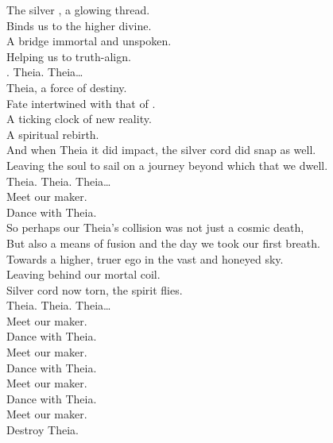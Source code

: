 
\label{album:the-silver-cord}



The silver , a glowing thread. \\
Binds us to the higher divine. \\
A bridge immortal and unspoken. \\
Helping us to truth-align. \\

. Theia. Theia… \\

Theia, a force of destiny. \\
Fate intertwined with that of . \\
A ticking clock of new reality. \\
A spiritual rebirth. \\
And when Theia it did impact, the silver cord did snap as well. \\
Leaving the soul to sail on a journey beyond which that we dwell. \\

Theia. Theia. Theia… \\

Meet our maker. \\
Dance with Theia. \\

So perhaps our Theia's collision was not just a cosmic death, \\
But also a means of fusion and the day we took our first breath. \\
Towards a higher, truer ego in the vast and honeyed sky. \\
Leaving behind our mortal coil. \\
Silver cord now torn, the spirit flies. \\

Theia. Theia. Theia… \\

Meet our maker. \\
Dance with Theia. \\
Meet our maker. \\
Dance with Theia. \\
Meet our maker. \\
Dance with Theia. \\
Meet our maker. \\
Destroy Theia. \\

